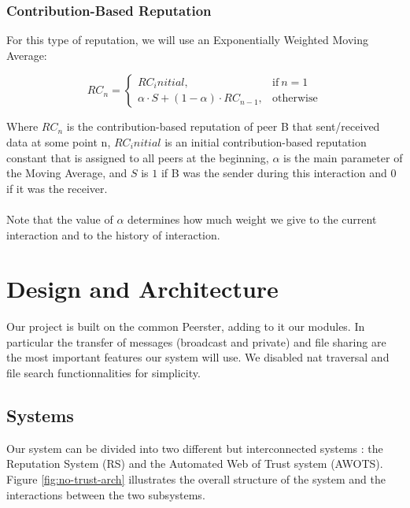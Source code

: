 \documentclass[]{article}
\begin{document}
\subsubsection{Contribution-Based Reputation}
For this type of reputation, we will use an Exponentially Weighted Moving Average:

\begin{equation}
    \label{eq:contr-rep}
    RC_n =
    \begin{cases}
        RC_initial,                                     & \text{if}\ n = 1
        \\
        \alpha \cdot S + (1 - \alpha) \cdot RC_{n - 1}, & \text{otherwise}
    \end{cases}
\end{equation}

\noindent
Where $RC_n$ is the contribution-based reputation of peer B that sent/received data at some point n, $RC_initial$ is an initial contribution-based reputation constant that is assigned to all peers at the beginning, $\alpha$ is the main parameter of the Moving Average, and $S$ is $1$ if B was the sender during this interaction and $0$ if it was the receiver.
\\\\
Note that the value of $\alpha$ determines how much weight we give to the current interaction and to the history of interaction.

\section{Design and Architecture}

Our project is built on the common Peerster, adding to it our modules. In particular the transfer of messages (broadcast and private) and file sharing are the most important features our system will use. We disabled nat traversal and file search functionnalities for simplicity.

\subsection{Systems}
Our system can be divided into two different but interconnected systems : the Reputation System (RS) and the Automated Web of Trust system (AWOTS). \newline
Figure \ref{fig:no-trust-arch} illustrates the overall structure of the system and the interactions between the two subsystems.
\end{document}
